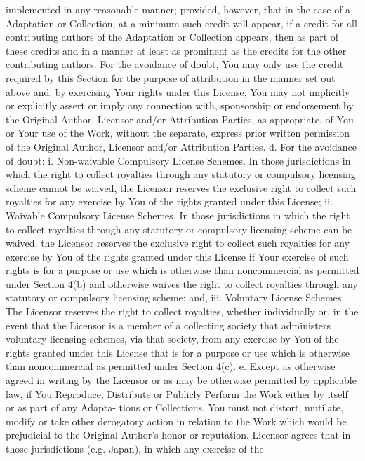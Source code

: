 \documentclass[oneside]{book}
\begin{document}
implemented in any reasonable manner; provided, however, that in the case of a
Adaptation or Collection, at a minimum such credit will appear, if a credit for
all contributing authors of the Adaptation or Collection appears, then as part
of these credits and in a manner at least as prominent as the credits for the
other contributing authors. For the avoidance of doubt, You may only use the
credit required by this Section for the purpose of attribution in the manner set
out above and, by exercising Your rights under this License, You may not
implicitly or explicitly assert or imply any connection with, sponsorship or
endorsement by the Original Author, Licensor and/or Attribution Parties, as
appropriate, of You or Your use of the Work, without the separate, express prior
written permission of the Original Author, Licensor and/or Attribution Parties.
d. For the avoidance of doubt: i. Non-waivable Compulsory License Schemes. In
those jurisdictions in which the right to collect royalties through any
statutory or compulsory licensing scheme cannot be waived, the Licensor reserves
the exclusive right to collect such royalties for any exercise by You of the
rights granted under this License; ii. Waivable Compulsory License Schemes. In
those jurisdictions in which the right to collect royalties through any
statutory or compulsory licensing scheme can be waived, the Licensor reserves
the exclusive right to collect such royalties for any exercise by You of the
rights granted under this License if Your exercise of such rights is for a
purpose or use which is otherwise than noncommercial as permitted under Section
4(b) and otherwise waives the right to collect royalties through any statutory
or compulsory licensing scheme; and, iii. Voluntary License Schemes. The
Licensor reserves the right to collect royalties, whether individually or, in
the event that the Licensor is a member of a collecting society that administers
voluntary licensing schemes, via that society, from any exercise by You of the
rights granted under this License that is for a purpose or use which is
otherwise than noncommercial as permitted under Section 4(c).  e. Except as
otherwise agreed in writing by the Licensor or as may be otherwise permitted by
applicable law, if You Reproduce, Distribute or Publicly Perform the Work either
by itself or as part of any Adapta- tions or Collections, You must not distort,
mutilate, modify or take other derogatory action in relation to the Work which
would be prejudicial to the Original Author's honor or reputation. Licensor
agrees that in those jurisdictions (e.g. Japan), in which any exercise of the
\end{document}
